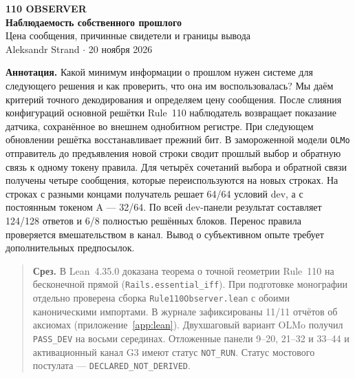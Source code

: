 \documentclass[11pt,a4paper]{article}
\theoremstyle{definition}
\begin{document}
\sloppy
\begin{center}
{\small\bfseries\color{accent}110 OBSERVER}\\[7pt]
{\LARGE\bfseries Наблюдаемость собственного прошлого}\\[5pt]
{\large Цена сообщения, причинные свидетели и границы вывода}\\[10pt]
Aleksandr Strand \hspace{1em} $\cdot$ \hspace{1em} 20 ноября 2026
\end{center}
\noindent\textbf{Аннотация.} Какой минимум информации о прошлом нужен системе для следующего решения и как проверить, что она им воспользовалась? Мы даём критерий точного декодирования и определяем цену сообщения. После слияния конфигураций основной решётки Rule~110 наблюдатель возвращает показание датчика, сохранённое во внешнем однобитном регистре. При следующем обновлении решётка восстанавливает прежний бит. В замороженной модели \texttt{OLMo} отправитель до предъявления новой строки сводит прошлый выбор и обратную связь к одному токену правила. Для четырёх сочетаний выбора и обратной связи получены четыре сообщения, которые переиспользуются на новых строках. На строках с разными концами получатель решает 64/64 условий dev, а с постоянным токеном A --- 32/64. По всей dev-панели результат составляет 124/128 ответов и 6/8 полностью решённых блоков. Перенос правила проверяется вмешательством в канал. Вывод о субъективном опыте требует дополнительных предпосылок.

\begin{quote}\small\raggedright
\textbf{Срез.} В Lean~4.35.0 доказана теорема о точной геометрии Rule~110 на бесконечной прямой (\texttt{Rails.essential\_iff}). При подготовке монографии отдельно проверена сборка \texttt{Rule110Observer.lean} с обоими каноническими импортами. В журнале зафиксированы 11/11 отчётов об аксиомах (приложение~\ref{app:lean}). Двухшаговый вариант OLMo получил \texttt{PASS\_DEV} на восьми серединах. Отложенные панели 9--20, 21--32 и 33--44 и активационный канал G3 имеют статус \texttt{NOT\_RUN}. Статус мостового постулата --- \texttt{DECLARED\_NOT\_DERIVED}.
\end{quote}
\tableofcontents
\clearpage







\appendix



{\small}
\end{document}

